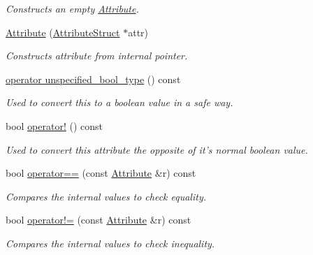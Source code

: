 \begin{DoxyCompactItemize}
\begin{DoxyCompactList}\small\item\em Constructs an empty \hyperlink{classphys_1_1xml_1_1Attribute}{Attribute}. \item\end{DoxyCompactList}\item 
\hyperlink{classphys_1_1xml_1_1Attribute_a6786df9d66c675c5a55761a7d3d512a5}{Attribute} (\hyperlink{structphys_1_1xml_1_1AttributeStruct}{AttributeStruct} $\ast$attr)
\begin{DoxyCompactList}\small\item\em Constructs attribute from internal pointer. \item\end{DoxyCompactList}\item 
\hyperlink{classphys_1_1xml_1_1Attribute_ab2cf442667b8ad1b443f0512ccaedcf9}{operator unspecified\_\-bool\_\-type} () const 
\begin{DoxyCompactList}\small\item\em Used to convert this to a boolean value in a safe way. \item\end{DoxyCompactList}\item 
bool \hyperlink{classphys_1_1xml_1_1Attribute_a18cb9f6900b0fc9e246b36d90e5bea5b}{operator!} () const 
\begin{DoxyCompactList}\small\item\em Used to convert this attribute the opposite of it's normal boolean value. \item\end{DoxyCompactList}\item 
bool \hyperlink{classphys_1_1xml_1_1Attribute_a68b6ba1299cc9a2019ec97b10bb8978b}{operator==} (const \hyperlink{classphys_1_1xml_1_1Attribute}{Attribute} \&r) const 
\begin{DoxyCompactList}\small\item\em Compares the internal values to check equality. \item\end{DoxyCompactList}\item 
bool \hyperlink{classphys_1_1xml_1_1Attribute_ae2371203e07dd781d2b38ba403b00816}{operator!=} (const \hyperlink{classphys_1_1xml_1_1Attribute}{Attribute} \&r) const 
\begin{DoxyCompactList}\small\item\em Compares the internal values to check inequality. \item\end{DoxyCompactList}\item 

\end{DoxyCompactItemize}
